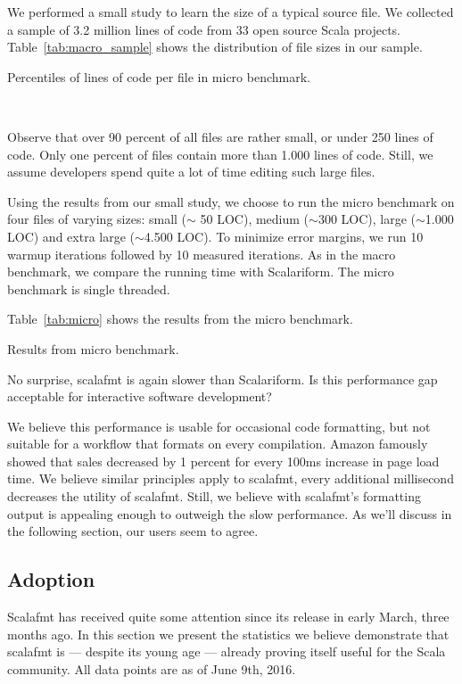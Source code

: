 We performed a small study to learn the size of a typical source file.
We collected a sample of 3.2 million lines of code from 33 open source Scala projects.
Table~\ref{tab:macro_sample} shows the distribution of file sizes in our sample.
\begin{table}
  \centering
  \caption{Percentiles of lines of code per file in micro benchmark.}~\label{tab:macro_sample}
  
\end{table}
Observe that over 90 percent of all files are rather small, or under 250 lines of code.
Only one percent of files contain more than 1.000 lines of code.
Still, we assume developers spend quite a lot of time editing such large files.

Using the results from our small study, we choose to run the micro benchmark on four files of varying sizes: small ($\sim$ 50 LOC), medium ($\sim$300 LOC), large ($\sim$1.000 LOC) and extra large ($\sim$4.500 LOC).
To minimize error margins, we run 10 warmup iterations followed by 10 measured iterations.
As in the macro benchmark, we compare the running time with Scalariform.
The micro benchmark is single threaded.

Table~\ref{tab:micro} shows the results from the micro benchmark.
\begin{table}
  \centering
  \caption{Results from micro benchmark.}\label{tab:micro}
  
\end{table}
No surprise, scalafmt is again slower than Scalariform.
Is this performance gap acceptable for interactive software development?

We believe this performance is usable for occasional code formatting, but not suitable for a workflow that formats on every compilation.
Amazon famously showed that sales decreased by 1 percent for every 100ms increase in page load time\autocite{kohavi2007online}.
We believe similar principles apply to scalafmt, every additional millisecond decreases the utility of scalafmt.
Still, we believe with scalafmt's formatting output is appealing enough to outweigh the slow performance.
As we'll discuss in the following section, our users seem to agree.

\subsection{Adoption}\label{sec:adoption}
Scalafmt has received quite some attention since its release in early March, three months ago.
In this section we present the statistics we believe demonstrate that scalafmt is --- despite its young age --- already proving itself useful for the Scala community.
All data points are as of June 9th, 2016.

